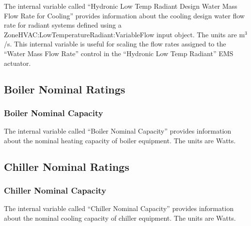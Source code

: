 The internal variable called ``Hydronic Low Temp Radiant Design Water Mass Flow Rate for Cooling'' provides information about the cooling design water flow rate for radiant systems defined using a ZoneHVAC:LowTemperatureRadiant:VariableFlow input object. The units are m\(^{3}\)/s. This internal variable is useful for scaling the flow rates assigned to the ``Water Mass Flow Rate'' control in the ``Hydronic Low Temp Radiant'' EMS actuator.

\subsection{Boiler Nominal Ratings}\label{boiler-nominal-ratings}

\subsubsection{Boiler Nominal Capacity}\label{boiler-nominal-capacity}

The internal variable called ``Boiler Nominal Capacity'' provides information about the nominal heating capacity of boiler equipment. The units are Watts.

\subsection{Chiller Nominal Ratings}\label{chiller-nominal-ratings}

\subsubsection{Chiller Nominal Capacity}\label{chiller-nominal-capacity}

The internal variable called ``Chiller Nominal Capacity'' provides information about the nominal cooling capacity of chiller equipment. The units are Watts.
